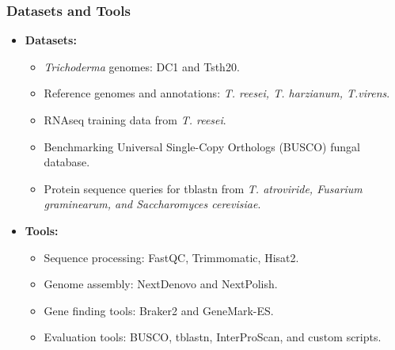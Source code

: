 \documentclass[t]{beamer}
\begin{document}
\begin{frame}
	\frametitle{Datasets and Tools}
	\begin{itemize}
		\item \textbf{Datasets:}
		\begin{itemize}
			\item \textit{Trichoderma} genomes: DC1 and Tsth20.
			\item Reference genomes and annotations: \textit{T. reesei, T. harzianum, T.virens}.
			\item RNAseq training data from \textit{T. reesei}. 
			\item Benchmarking Universal Single-Copy Orthologs (BUSCO) fungal database.
			\item Protein sequence queries for tblastn from \textit{T. atroviride, Fusarium graminearum, and Saccharomyces cerevisiae}.	
		\end{itemize}
		\item \textbf{Tools:}
		\begin{itemize}
			\item Sequence processing: FastQC, Trimmomatic, Hisat2.
			\item Genome assembly: NextDenovo and NextPolish.
			\item Gene finding tools: Braker2 and GeneMark-ES.
			\item Evaluation tools: BUSCO, tblastn, InterProScan, and custom scripts.
		\end{itemize}
	\end{itemize}
\end{frame}
\end{document}

